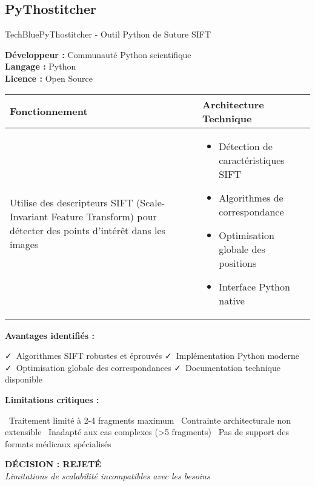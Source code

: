 \documentclass[11pt,a4paper]{article}
\newcommand{\pro}[1]{\textcolor{SuccessGreen}{\faCheck\ #1}}
\newcommand{\con}[1]{\textcolor{DangerRed}{\faTimes\ #1}}
\begin{document}
\subsection{PyThostitcher}

\begin{techbox}{TechBlue}{PyThostitcher - Outil Python de Suture SIFT}

\textbf{Développeur :} Communauté Python scientifique \\
\textbf{Langage :} Python \\
\textbf{Licence :} Open Source

\vspace{0.5cm}

\begin{tabularx}{\textwidth}{|X|X|}
\hline
\rowcolor{LightGray}
\textbf{Fonctionnement} & \textbf{Architecture Technique} \\
\hline
Utilise des descripteurs SIFT (Scale-Invariant Feature Transform) pour détecter des points d'intérêt dans les images & 
\begin{itemize}[nosep]
\item Détection de caractéristiques SIFT
\item Algorithmes de correspondance
\item Optimisation globale des positions
\item Interface Python native
\end{itemize} \\
\hline
\end{tabularx}

\vspace{0.5cm}

\textbf{Avantages identifiés :}
\begin{itemize}[leftmargin=*]
    \pro{Algorithmes SIFT robustes et éprouvés}
    \pro{Implémentation Python moderne}
    \pro{Optimisation globale des correspondances}
    \pro{Documentation technique disponible}
\end{itemize}

\textbf{Limitations critiques :}
\begin{itemize}[leftmargin=*]
    \con{Traitement limité à 2-4 fragments maximum}
    \con{Contrainte architecturale non extensible}
    \con{Inadapté aux cas complexes (>5 fragments)}
    \con{Pas de support des formats médicaux spécialisés}
\end{itemize}

\begin{center}
\textbf{\textcolor{DangerRed}{DÉCISION : REJETÉ}}\\
\textit{Limitations de scalabilité incompatibles avec les besoins}
\end{center}

\end{techbox}
\end{document}
